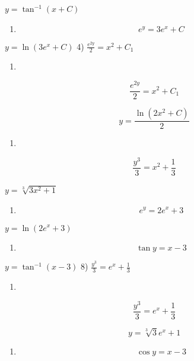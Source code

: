 \documentclass[
]{article}
\providecommand{\tightlist}{%
  \setlength{\itemsep}{0pt}\setlength{\parskip}{0pt}}
\begin{document}
\(y = \tan^{-1} (x + C)\)

\begin{enumerate}
\def\labelenumi{\arabic{enumi})}
\setcounter{enumi}{2}
\tightlist
\item
  \[e^y = 3e^x + C\]
\end{enumerate}

\(y = \ln (3e^x + C)\) 4) \(\frac{e^{2y}}{2} = x^2 + C_1\)

\begin{enumerate}
\def\labelenumi{\arabic{enumi})}
\setcounter{enumi}{3}
\tightlist
\item
\end{enumerate}

\[\frac{e^{2y}}{2} = x^2 + C_1\]

\[y = \frac{\ln(2x^2 + C)}{2}\]

\begin{enumerate}
\def\labelenumi{\arabic{enumi})}
\setcounter{enumi}{4}
\tightlist
\item
\end{enumerate}

\[\frac{y^3}{3} = x^2 + \frac{1}{3}\]

\(y = \sqrt[3]{3x^2 + 1}\)

\begin{enumerate}
\def\labelenumi{\arabic{enumi})}
\setcounter{enumi}{5}
\tightlist
\item
  \[e^y = 2e^x + 3\]
\end{enumerate}

\(y = \ln (2e^x + 3)\)

\begin{enumerate}
\def\labelenumi{\arabic{enumi})}
\setcounter{enumi}{6}
\tightlist
\item
  \[\tan y = x - 3\]
\end{enumerate}

\(y = \tan^{-1}(x - 3)\) 8) \(\frac{y^3}{3} = e^x + \frac{1}{3}\)

\begin{enumerate}
\def\labelenumi{\arabic{enumi})}
\setcounter{enumi}{7}
\tightlist
\item
\end{enumerate}

\[\frac{y^3}{3} = e^x + \frac{1}{3}\]

\[y = \sqrt[3]{3}e^x + 1\]

\begin{enumerate}
\def\labelenumi{\arabic{enumi})}
\setcounter{enumi}{8}
\tightlist
\item
  \[\cos y = x - 3\]
\end{enumerate}
\end{document}
